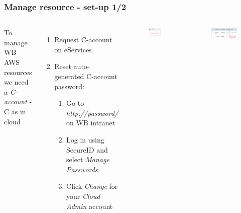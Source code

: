 \documentclass[aspectratio=169]{beamer} %
\begin{document}
\begin{frame}
	\frametitle{Manage resource - set-up 1/2}
	\begin{columns}[c]
		
		
		To manage WB AWS resources we need a \textit{C-account} - C as in cloud
		
		\begin{enumerate}
			\item Request C-account on eServices
			\item Reset auto-generated C-account password:
			\begin{enumerate}
				\item Go to \textit{http://password/} on WB intranet
				\item Log in using SecureID and select \textit{Manage Passwords}
				\item Click \textit{Change} for your \textit{Cloud Admin} account 
			\end{enumerate}

		\end{enumerate}
		
		\begin{figure}
			\centering
			\includegraphics[width=.5\textwidth]{./img/password-1.png}
		\end{figure}
		\vspace{.2cm}
		\begin{figure}
			\centering
			\includegraphics[width=1\textwidth]{./img/password-2.png}
		\end{figure}
		
	\end{columns}
\end{frame}
\end{document}
